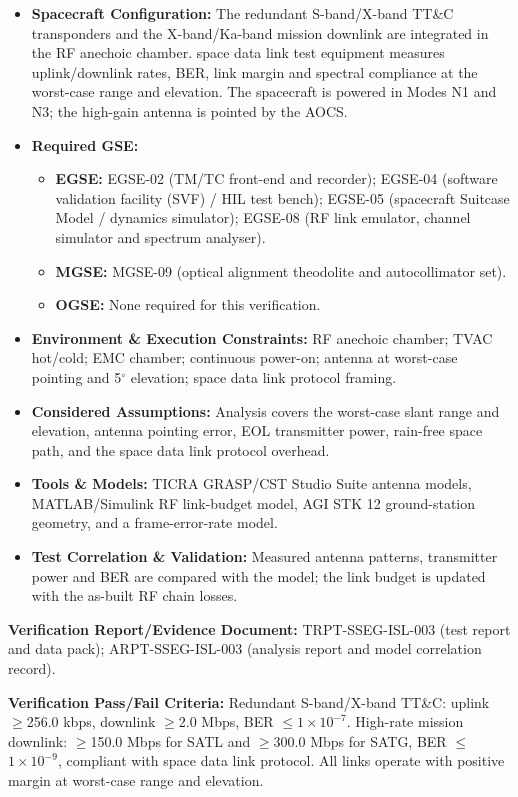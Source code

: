 \begin{itemize}
\item \textbf{Spacecraft Configuration:} The redundant S-band/X-band TT\&C transponders and the X-band/Ka-band mission downlink are integrated in the RF anechoic chamber. space data link test equipment measures uplink/downlink rates, BER, link margin and spectral compliance at the worst-case range and elevation. The spacecraft is powered in Modes N1 and N3; the high-gain antenna is pointed by the AOCS.
\item \textbf{Required GSE:}
\begin{itemize}
\item \textbf{EGSE:} EGSE-02 (TM/TC front-end and recorder); EGSE-04 (software validation facility (SVF) / HIL test bench); EGSE-05 (spacecraft Suitcase Model / dynamics simulator); EGSE-08 (RF link emulator, channel simulator and spectrum analyser).
\item \textbf{MGSE:} MGSE-09 (optical alignment theodolite and autocollimator set).
\item \textbf{OGSE:} None required for this verification.
\end{itemize}
\item \textbf{Environment \& Execution Constraints:} RF anechoic chamber; TVAC hot/cold; EMC chamber; continuous power-on; antenna at worst-case pointing and 5$^\circ$ elevation; space data link protocol framing.
\item \textbf{Considered Assumptions:} Analysis covers the worst-case slant range and elevation, antenna pointing error, EOL transmitter power, rain-free space path, and the space data link protocol overhead.
\item \textbf{Tools \& Models:} TICRA GRASP/CST Studio Suite antenna models, MATLAB/Simulink RF link-budget model, AGI STK 12 ground-station geometry, and a frame-error-rate model.
\item \textbf{Test Correlation \& Validation:} Measured antenna patterns, transmitter power and BER are compared with the model; the link budget is updated with the as-built RF chain losses.
\end{itemize}
\par\textbf{Verification Report/Evidence Document:} TRPT-SSEG-ISL-003 (test report and data pack); ARPT-SSEG-ISL-003 (analysis report and model correlation record).
\par\textbf{Verification Pass/Fail Criteria:} Redundant S-band/X-band TT\&C: uplink $\ge$256.0 kbps, downlink $\ge$2.0 Mbps, BER $\le$$1\times10^{-7}$. High-rate mission downlink: $\ge$150.0 Mbps for SATL and $\ge$300.0 Mbps for SATG, BER $\le$$1\times10^{-9}$, compliant with space data link protocol. All links operate with positive margin at worst-case range and elevation.
\par\medskip
